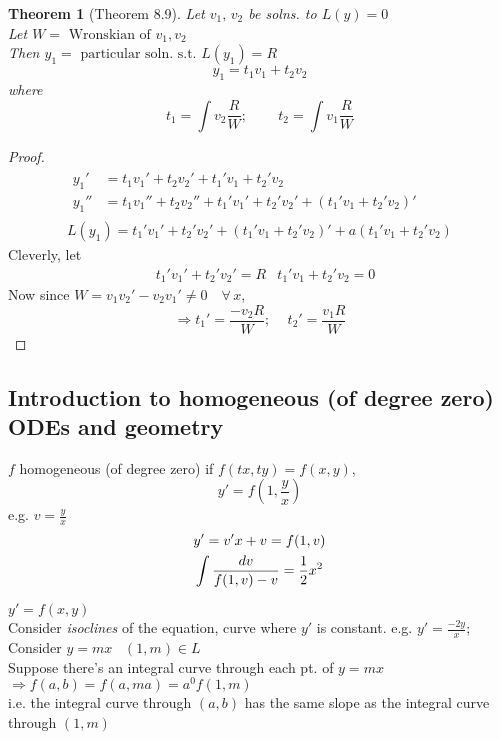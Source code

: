 \documentclass[twoside]{amsart}
\theoremstyle{plain}
\newtheorem{theorem}{Theorem}
\theoremstyle{definition}
\begin{document}
\begin{theorem}[Theorem 8.9] Let $v_1, \, v_2$ be solns. to $L(y) = 0$ \medskip \\
  Let $W = \text{ Wronskian of $v_1, v_2$ } $ \bigskip \\
  Then $y_1 = \text{ particular soln. s.t. $L(y_1) =R $ } $ 
\begin{equation}
y_1 = t_1 v_1 + t_2 v_2 
\end{equation}
where 
\begin{equation*}
  t_1 = \int v_2 \frac{R}{W}; \quad \quad \, t_2 = \int v_1 \frac{R}{W} 
\end{equation*}
\end{theorem}

\begin{proof}
  \[
\begin{gathered}
  \begin{aligned}
    y_1' & = t_1 v_1' + t_2 v_2' + t_1' v_1 + t_2' v_2 \\
    y_1'' & = t_1 v_1'' +t_2 v_2'' + t_1' v_1' + t_2' v_2' + (t_1' v_1 +t_2' v_2)' 
  \end{aligned} \\
L(y_1) = t_1'v_1' +t_2' v_2' + (t_1' v_1 +t_2' v_2)' + a(t_1' v_1 + t_2' v_2 ) 
\end{gathered}
\]
Cleverly, let
\[
\begin{aligned}
  &  t_1' v_1' + t_2' v_2' = R 
  & t_1' v_1 + t_2' v_2 = 0 
\end{aligned}
\]
Now since $W = v_1v_2' - v_2v_1' \neq 0 \quad \forall \, x$, 
\[
\Longrightarrow t_1' = \frac{-v_2 R}{W} ; \quad \, t_2' = \frac{v_1 R}{W}
\]
\end{proof}

\subsection*{ Introduction to homogeneous (of degree zero) ODEs and geometry }
$f$ homogeneous (of degree zero) if $f(tx,ty) = f(x,y)$, 
\begin{equation*}
y' = f(1, \frac{y}{x} )
\end{equation*}
e.g. $v = \frac{y}{x}$ 
\begin{gather}
  y' = v' x + v = f(1,v) \notag \\
  \int \frac{dv}{ f(1,v)- v } = \frac{1}{2} x^2 
\end{gather}

$y' = f(x,y)$ \bigskip \\
Consider \emph{ isoclines } of the equation, curve where $y'$ is constant.  
e.g. $y' = \frac{-2y}{x}$; Consider $y=mx$  \quad \quad \, $(1,m) \in L$ \medskip \\
Suppose there's an integral curve through each pt. of $y=mx$ \quad $\Longrightarrow f(a,b) = f(a,ma) = a^0 f(1,m)$  \medskip \\
i.e. the integral curve through $(a,b)$ has the same slope as the integral curve through $(1,m)$
\end{document}
